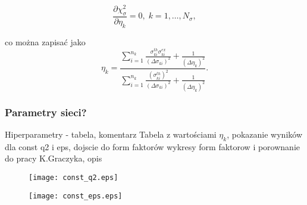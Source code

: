 \documentclass[11pt]{book}
\theoremstyle{definition}
\begin{document}
\begin{equation}
\frac{\partial \chi_{\sigma}^2}{\partial \eta_k} = 0, \; k = 1,\dots,N_{\sigma}, \label{eq_eta1}
\end{equation}

co można zapisać jako
%
\begin{equation}
\eta_k = \frac{\sum_{i=1}^{n_k}\frac{\sigma_{ki}^{th} \sigma_{ki}^{ex}}{\left(\Delta \sigma_{ki}\right)^2} + \frac{1}{\left(\Delta \eta_k\right)^2}}{\sum_{i=1}^{n_k}\frac{\left(\sigma_{ki}^{th}\right)^2}{\left(\Delta \sigma_{ki}\right)^2} + \frac{1}{\left(\Delta \eta_k\right)^2}}. \label{eq_eta2}
\end{equation}
%

\subsubsection{Parametry sieci?}
Hiperparametry - tabela, komentarz
Tabela z wartościami $\eta_k$, pokazanie wyników dla const q2 i eps, dojscie do form faktorów wykresy form faktorow i porownanie do pracy K.Graczyka, opis


\begin{figure}[htp!]
	\centering
	\texttt{[image: const\_q2.eps]}
	\caption{} 
	\label{fig:const_q2}
\end{figure}
%
\begin{figure}[htp!]
	\centering
	\texttt{[image: const\_eps.eps]}
	\caption{} 
	\label{fig:const_eps}
\end{figure}
\end{document}
